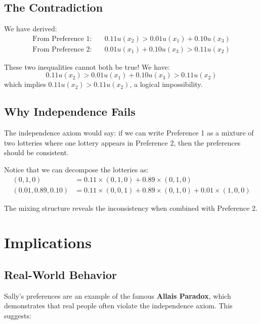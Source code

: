 \documentclass[12pt]{article}
\begin{document}
\subsection{The Contradiction}

We have derived:
\begin{align*}
\text{From Preference 1:} \quad &0.11u(x_2) > 0.01u(x_1) + 0.10u(x_3)\\
\text{From Preference 2:} \quad &0.01u(x_1) + 0.10u(x_3) > 0.11u(x_2)
\end{align*}

\begin{tcolorbox}[colback=red!5!white,colframe=red!75!black,title=Contradiction!]
These two inequalities cannot both be true! We have:
$$0.11u(x_2) > 0.01u(x_1) + 0.10u(x_3) > 0.11u(x_2)$$
which implies $0.11u(x_2) > 0.11u(x_2)$, a logical impossibility.
\end{tcolorbox}

\subsection{Why Independence Fails}

The independence axiom would say: if we can write Preference 1 as a mixture of two lotteries where one lottery appears in Preference 2, then the preferences should be consistent.

Notice that we can decompose the lotteries as:
\begin{align*}
(0, 1, 0) &= 0.11 \times (0, 1, 0) + 0.89 \times (0, 1, 0)\\
(0.01, 0.89, 0.10) &= 0.11 \times (0, 0, 1) + 0.89 \times (0, 1, 0) + 0.01 \times (1, 0, 0)
\end{align*}

The mixing structure reveals the inconsistency when combined with Preference 2.

\section{Implications}

\subsection{Real-World Behavior}

Sally's preferences are an example of the famous \textbf{Allais Paradox}, which demonstrates that real people often violate the independence axiom. This suggests:
\end{document}
